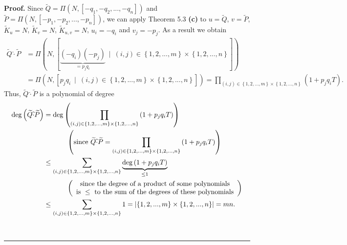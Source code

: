 \documentclass[numbers=enddot,12pt,final,onecolumn,notitlepage]{scrartcl}%
\newenvironment{proof}[1][Proof]{\noindent\textbf{#1.} }{\ \rule{0.5em}{0.5em}}
\begin{document}
\begin{proof}
Since $\widetilde{Q}=\Pi\left(  N,\left[  -q_{1},-q_{2},...,-q_{n}\right]
\right)  $ and $\widetilde{P}=\Pi\left(  N,\left[  -p_{1},-p_{2}%
,...,-p_{n}\right]  \right)  $, we can apply Theorem 5.3 \textbf{(c)} to
$u=\widetilde{Q}$, $v=\widetilde{P}$, $\widetilde{K}_{u}=N$, $\widetilde{K}%
_{v}=N$, $\widetilde{K}_{u,v}=N$, $u_{i}=-q_{i}$ and $v_{j}=-p_{j}$. As a
result we obtain%
\begin{align*}
\widetilde{Q}\widehat{\cdot}\widetilde{P}  &  =\Pi\left(  N,\left[
\underbrace{\left(  -q_{i}\right)  \left(  -p_{j}\right)  }_{=p_{j}q_{i}%
}\ \mid\ \left(  i,j\right)  \in\left\{  1,2,...,m\right\}  \times\left\{
1,2,...,n\right\}  \right]  \right) \\
&  =\Pi\left(  N,\left[  p_{j}q_{i}\ \mid\ \left(  i,j\right)  \in\left\{
1,2,...,m\right\}  \times\left\{  1,2,...,n\right\}  \right]  \right)
=\prod\limits_{\left(  i,j\right)  \in\left\{  1,2,...,m\right\}
\times\left\{  1,2,...,n\right\}  }\left(  1+p_{j}q_{i}T\right)  .
\end{align*}
Thus, $\widetilde{Q}\widehat{\cdot}\widetilde{P}$ is a polynomial of degree%
\begin{align*}
\deg\left(  \widetilde{Q}\widehat{\cdot}\widetilde{P}\right)   &  =\deg\left(
\prod\limits_{\left(  i,j\right)  \in\left\{  1,2,...,m\right\}
\times\left\{  1,2,...,n\right\}  }\left(  1+p_{j}q_{i}T\right)  \right) \\
&  \ \ \ \ \ \ \ \ \ \ \left(  \text{since }\widetilde{Q}\widehat{\cdot
}\widetilde{P}=\prod\limits_{\left(  i,j\right)  \in\left\{
1,2,...,m\right\}  \times\left\{  1,2,...,n\right\}  }\left(  1+p_{j}%
q_{i}T\right)  \right) \\
&  \leq\sum\limits_{\left(  i,j\right)  \in\left\{  1,2,...,m\right\}
\times\left\{  1,2,...,n\right\}  }\underbrace{\deg\left(  1+p_{j}%
q_{i}T\right)  }_{\leq1}\\
&  \ \ \ \ \ \ \ \ \ \ \left(
\begin{array}
[c]{c}%
\text{since the degree of a product of some polynomials}\\
\text{is }\leq\text{ to the sum of the degrees of these polynomials}%
\end{array}
\right) \\
&  \leq\sum\limits_{\left(  i,j\right)  \in\left\{  1,2,...,m\right\}
\times\left\{  1,2,...,n\right\}  }1=\left\vert \left\{  1,2,...,m\right\}
\times\left\{  1,2,...,n\right\}  \right\vert =mn.
\end{align*}



\end{proof}
\end{document}
